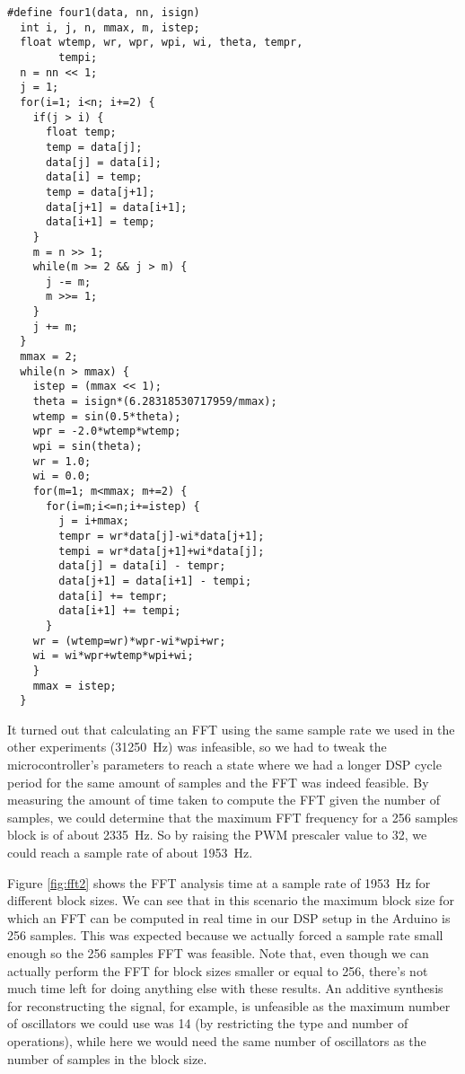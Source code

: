 \begin{lstlisting}
#define four1(data, nn, isign)
  int i, j, n, mmax, m, istep;
  float wtemp, wr, wpr, wpi, wi, theta, tempr,
        tempi;
  n = nn << 1;
  j = 1;
  for(i=1; i<n; i+=2) {
    if(j > i) {
      float temp;
      temp = data[j];
      data[j] = data[i];
      data[i] = temp;
      temp = data[j+1];
      data[j+1] = data[i+1];
      data[i+1] = temp;
    }
    m = n >> 1;
    while(m >= 2 && j > m) {
      j -= m;
      m >>= 1;
    }
    j += m;
  }
  mmax = 2;
  while(n > mmax) {
    istep = (mmax << 1);
    theta = isign*(6.28318530717959/mmax);
    wtemp = sin(0.5*theta);
    wpr = -2.0*wtemp*wtemp;
    wpi = sin(theta);
    wr = 1.0;
    wi = 0.0;
    for(m=1; m<mmax; m+=2) {
      for(i=m;i<=n;i+=istep) {
        j = i+mmax;
        tempr = wr*data[j]-wi*data[j+1];
        tempi = wr*data[j+1]+wi*data[j];
        data[j] = data[i] - tempr;
        data[j+1] = data[i+1] - tempi;
        data[i] += tempr;
        data[i+1] += tempi;
      }
    wr = (wtemp=wr)*wpr-wi*wpi+wr;
    wi = wi*wpr+wtemp*wpi+wi;
    }
    mmax = istep;
  }
\end{lstlisting}

It turned out that calculating an FFT using the same sample rate we used in the other experiments (31250~Hz) was infeasible, so we had to tweak the microcontroller's parameters to reach a state where we had a longer DSP cycle period for the same amount of samples and the FFT was indeed feasible. By measuring the amount of time taken to compute the FFT given the number of samples, we could determine that the maximum FFT frequency for a 256 samples block is of about 2335~Hz. So by raising the PWM prescaler value to 32, we could reach a sample rate of about 1953~Hz. 

Figure \ref{fig:fft2} shows the FFT analysis time at a sample rate of 1953~Hz for different block sizes. We can see that in this scenario the maximum block size for which an FFT can be computed in real time in our DSP setup in the Arduino is 256 samples. This was expected because we actually forced a sample rate small enough so the 256 samples FFT was feasible. Note that, even though we can actually perform the FFT for block sizes smaller or equal to 256, there's not much time left for doing anything else with these results. An additive synthesis for reconstructing the signal, for example, is unfeasible as the maximum number of oscillators we could use was 14 (by restricting the type and number of operations), while here we would need the same number of oscillators as the number of samples in the block size.





